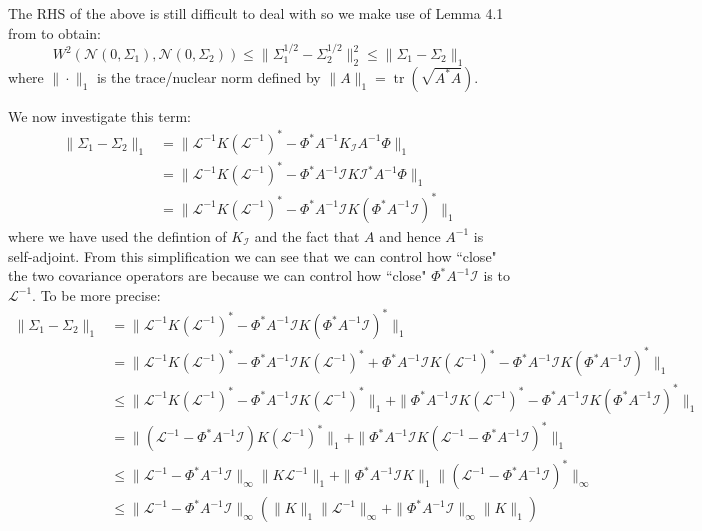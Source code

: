 The RHS of the above is still difficult to deal with so we make use of Lemma 4.1 from \textcolor{blue}{\citep{powers1970free}} to obtain:
\begin{equation}
    W^2(\mathcal{N}(0,\Sigma_1),\mathcal{N}(0,\Sigma_2))\leq\|\Sigma_{1}^{1/2}-\Sigma_{2}^{1/2}\|_{2}^{2}\leq\|\Sigma_1-\Sigma_2\|_{1}
\end{equation}
where $\|\cdot\|_1$ is the trace/nuclear norm defined by $\|A\|_{1}=\operatorname{tr}(\sqrt{A^{*}A})$.

We now investigate this term:
\begin{align*}
    \|\Sigma_{1}-\Sigma_2\|_{1}&=\|\mathcal{L}^{-1}K(\mathcal{L}^{-1})^{*}-\Phi^{*}A^{-1}K_{\mathcal{I}}A^{-1}\Phi\|_{1} \\
    &=\|\mathcal{L}^{-1}K(\mathcal{L}^{-1})^{*}-\Phi^{*}A^{-1}\mathcal{I}K\mathcal{I}^{*}A^{-1}\Phi\|_{1} \\
    &=\|\mathcal{L}^{-1}K(\mathcal{L}^{-1})^{*}-\Phi^{*}A^{-1}\mathcal{I}K(\Phi^{*}A^{-1}\mathcal{I})^{*}\|_{1}
\end{align*}
where we have used the defintion of $K_{\mathcal{I}}$ and the fact that $A$ and hence $A^{-1}$ is self-adjoint. From this simplification we can see that we can control how ``close" the two covariance operators are because we can control how ``close" $\Phi^{*}A^{-1}\mathcal{I}$ is to $\mathcal{L}^{-1}$. To be more precise:
\begin{align*}
    \|\Sigma_{1}-\Sigma_{2}\|_{1}&=\|\mathcal{L}^{-1}K(\mathcal{L}^{-1})^{*}-\Phi^{*}A^{-1}\mathcal{I}K(\Phi^{*}A^{-1}\mathcal{I})^{*}\|_{1} \\
    &=\|\mathcal{L}^{-1}K(\mathcal{L}^{-1})^{*}-\Phi^{*}A^{-1}\mathcal{I}K(\mathcal{L}^{-1})^{*}+\Phi^{*}A^{-1}\mathcal{I}K(\mathcal{L}^{-1})^{*}-\Phi^{*}A^{-1}\mathcal{I}K(\Phi^{*}A^{-1}\mathcal{I})^{*}\|_{1} \\
    &\leq\|\mathcal{L}^{-1}K(\mathcal{L}^{-1})^{*}-\Phi^{*}A^{-1}\mathcal{I}K(\mathcal{L}^{-1})^{*}\|_{1} + \|\Phi^{*}A^{-1}\mathcal{I}K(\mathcal{L}^{-1})^{*}-\Phi^{*}A^{-1}\mathcal{I}K(\Phi^{*}A^{-1}\mathcal{I})^{*}\|_{1} \\
    &= \|(\mathcal{L}^{-1}-\Phi^{*}A^{-1}\mathcal{I})K(\mathcal{L}^{-1})^{*}\|_{1} + \|\Phi^{*}A^{-1}\mathcal{I}K(\mathcal{L}^{-1}-\Phi^{*}A^{-1}\mathcal{I})^{*}\|_{1} \\
    &\leq\|\mathcal{L}^{-1}-\Phi^{*}A^{-1}\mathcal{I}\|_{\infty}\|K\mathcal{L}^{-1}\|_{1}+\|\Phi^{*}A^{-1}\mathcal{I}K\|_{1}\|(\mathcal{L}^{-1}-\Phi^{*}A^{-1}\mathcal{I})^{*}\|_{\infty} \\
    &\leq\|\mathcal{L}^{-1}-\Phi^{*}A^{-1}\mathcal{I}\|_{\infty}(\|K\|_{1}\|\mathcal{L}^{-1}\|_{\infty}+\|\Phi^{*}A^{-1}\mathcal{I}\|_{\infty}\|K\|_{1})
\end{align*}
